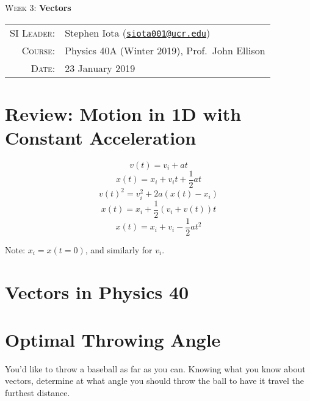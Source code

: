 \documentclass[12pt]{article}
\newcommand{\email}[1]{\texttt{\href{mailto:#1}{#1}}}
\begin{document}
\begin{center}

\Large{\textsc{Week 3}: \textbf{Vectors}}

\end{center}

\vspace{.5mm}



\begin{tabular}{rl}
\textsc{SI Leader}:
&
Stephen Iota (\email{siota001@ucr.edu})
\\
\textsc{Course}:
&
Physics 40A (Winter 2019), Prof.~John Ellison
\\
\textsc{Date}:
&
23 January 2019
\end{tabular}



\section*{Review: Motion in 1D with Constant Acceleration}


\begin{equation}
	v(t) = v_i + at
\end{equation}
\begin{equation}
	x(t) = x_i + v_it + \frac{1}{2}at
\end{equation}
\begin{equation}
	v(t)^2 = v_{i}^2	 + 2a(x(t) - x_i)
\end{equation}
\begin{equation}
	x(t) = x_i + \frac{1}{2}(v_i + v(t))t
\end{equation}
\begin{equation}
	x(t) = x_i + v_i - \frac{1}{2}at^2
\end{equation}

Note: $x_i = x(t=0)$, and similarly for $v_i$.   


\section{Vectors in Physics 40}


\section{Optimal Throwing Angle}
You'd like to throw a baseball as far as you can. Knowing what you know about vectors, determine at what angle you should throw the ball to have it travel the furthest distance. 
\end{document}
